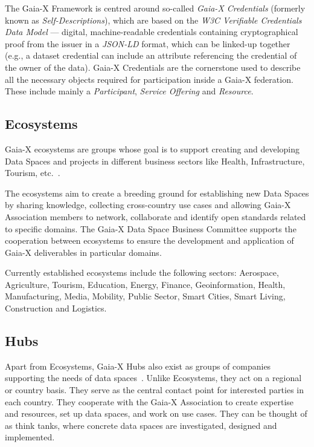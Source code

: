 The Gaia-X Framework is centred around so-called \textit{Gaia-X Credentials} (formerly known as \textit{Self-Descriptions}), which are based on the \textit{W3C Verifiable Credentials Data Model} --- digital, machine-readable credentials containing cryptographical proof from the issuer in a \textit{JSON-LD} format, which can be linked-up together (e.g., a dataset credential can include an attribute referencing the credential of the owner of the data).
Gaia-X Credentials are the cornerstone used to describe all the necessary objects required for participation inside a Gaia-X federation.
These include mainly a \textit{Participant}, \textit{Service Offering} and \textit{Resource}.

\subsection{Ecosystems}\label{subsec:ecosystems}

Gaia-X ecosystems are groups whose goal is to support creating and developing Data Spaces and projects in different business sectors like Health, Infrastructure, Tourism, etc.~\cite{gaiax}.

The ecosystems aim to create a breeding ground for establishing new Data Spaces by sharing knowledge, collecting cross-country use cases and allowing Gaia-X Association members to network, collaborate and identify open standards related to specific domains.
The Gaia-X Data Space Business Committee supports the cooperation between ecosystems to ensure the development and application of Gaia-X deliverables in particular domains.

Currently established ecosystems include the following sectors: Aerospace, Agriculture, Tourism, Education, Energy, Finance, Geoinformation, Health, Manufacturing, Media, Mobility, Public Sector, Smart Cities, Smart Living, Construction and Logistics.

\subsection{Hubs}\label{subsec:hubs}

Apart from Ecosystems, Gaia-X Hubs also exist as groups of companies supporting the needs of data spaces~\cite{gaiax}.
Unlike Ecosystems, they act on a regional or country basis.
They serve as the central contact point for interested parties in each country.
They cooperate with the Gaia-X Association to create expertise and resources, set up data spaces, and work on use cases.
They can be thought of as think tanks, where concrete data spaces are investigated, designed and implemented.

